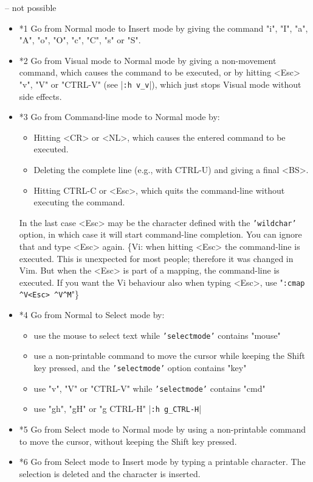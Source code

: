 -- not possible

\begin{itemize}
				\item *1 Go from Normal mode to Insert mode by giving the command "i", "I", "a", "A", "o", "O", "c", "C", "s" or "S".
				\item *2 Go from Visual mode to Normal mode by giving a non-movement command, which causes the command to be executed, or by hitting <Esc> "v", "V" or "CTRL-V" (see |\texttt{:h v\_v}|), which just stops Visual mode without side effects.
				\item *3 Go from Command-line mode to Normal mode by:
								\begin{itemize}
												\item Hitting <CR> or <NL>, which causes the entered command to be executed.
												\item Deleting the complete line (e.g., with CTRL-U) and giving a final <BS>.
												\item Hitting CTRL-C or <Esc>, which quits the command-line without executing
																the command.
								\end{itemize}
								In the last case <Esc> may be the character defined with the \texttt{'wildchar'} option, in which case it will start command-line completion.
								You can ignore that and type <Esc> again.
								\{Vi: when hitting <Esc> the command-line is executed.
								This is unexpected for most people; therefore it was changed in Vim.
								But when the <Esc> is part of a mapping, the command-line is executed.
								If you want the Vi behaviour also when typing <Esc>, use "\texttt{:cmap \^{}V<Esc> \^{}V\^{}M}"\}
				\item *4 Go from Normal to Select mode by:
								\begin{itemize}
												\item use the mouse to select text while \texttt{'selectmode'} contains "mouse"
												\item use a non-printable command to move the cursor while keeping the Shift key pressed, and the \texttt{'selectmode'} option contains "key"
												\item use "v", "V" or "CTRL-V" while \texttt{'selectmode'} contains "cmd"
												\item use "gh", "gH" or "g CTRL-H"  |\texttt{:h g\_CTRL-H}|
								\end{itemize}
				\item *5 Go from Select mode to Normal mode by using a non-printable command to move the cursor, without keeping the Shift key pressed.
				\item *6 Go from Select mode to Insert mode by typing a printable character.
								The selection is deleted and the character is inserted.
\end{itemize}

